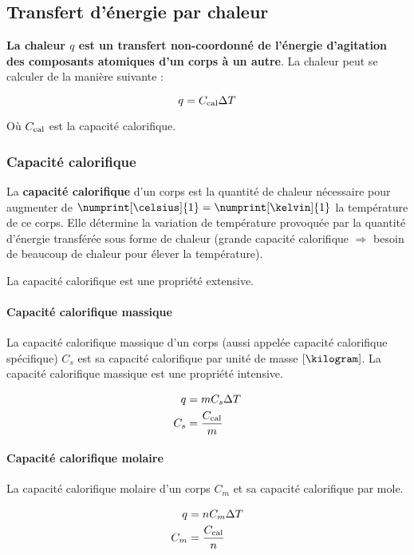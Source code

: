 \subsection{Transfert d'énergie par chaleur}
\textbf{La chaleur $q$ est un transfert non-coordonné de l'énergie d'agitation des composants
atomiques d'un corps à un autre}. La chaleur peut se calculer de la manière suivante :

$$q = C_\mathrm{cal} \Delta T$$

Où $C_\mathrm{cal}$ est la capacité calorifique.

\subsubsection{Capacité calorifique}\label{sec:C_cal}
La \textbf{capacité calorifique} d'un corps est la quantité de chaleur nécessaire pour augmenter de $\numprint[\celsius]{1} = \numprint[\kelvin]{1}$ la température de ce corps.
Elle détermine la variation de température provoquée par la quantité d'énergie transférée sous forme de chaleur (grande capacité calorifique $\Rightarrow$ besoin de beaucoup de chaleur pour élever la température).

La capacité calorifique est une propriété extensive.

\paragraph{Capacité calorifique massique} \label{sec:C_s}
La capacité calorifique massique d'un corps (aussi appelée capacité
calorifique spécifique) $C_s$ est sa capacité calorifique par unité de masse $[\kilogram]$.
La capacité calorifique massique est une propriété intensive.

\begin{align*}
  q 	&= m C_s \Delta T\\
  C_s &= \frac{C_\mathrm{cal}}{m}
\end{align*}

\paragraph{Capacité calorifique molaire}
La capacité calorifique molaire d'un corps $C_m$ et sa capacité calorifique par mole. 

\begin{align*}
  q 	&= n C_m \Delta T\\
  C_m &= \frac{C_\mathrm{cal}}{n}
\end{align*}

